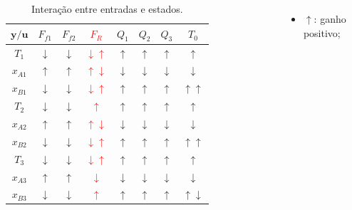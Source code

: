 \begin{frame}
  \newcommand{\ua}{$\uparrow$}
  \newcommand{\da}{$\downarrow$}
  \newcommand{\nz}{$\approx 0$}
  \newcommand{\nm}{$^{\text{nm}}$}
  \begin{columns}
    \small
    \begin{table}[h!]
      \centering
      \begin{tabular}{c|ccccccc}
        \hline
        $\mathbf{y} / \mathbf{u}$ & $F_{f1}$ & $F_{f2}$ & \textcolor{red}{$F_R$} & $Q_1$ & $Q_2$ & $Q_3$ & $T_0$ \\
        \hline
        $T_1$    & \da & \da & \textcolor{red}{\da\ua} & \ua    & \ua    & \ua    & \ua    \\
        $x_{A1}$ & \ua & \ua & \textcolor{red}{\ua\da} & \da    & \da    & \da    & \da    \\
        $x_{B1}$ & \da & \da & \textcolor{red}{\da\ua} & \ua    & \ua    & \ua    & \ua\ua \\
        \hline
        $T_2$    & \da & \da & \textcolor{red}{\ua}    & \ua    & \ua    & \ua    & \ua    \\
        $x_{A2}$ & \ua & \ua & \textcolor{red}{\ua\da} & \da    & \da    & \da    & \da    \\
        $x_{B2}$ & \da & \da & \textcolor{red}{\da\ua} & \ua    & \ua    & \ua    & \ua\ua \\
        \hline
        $T_3$    & \da & \da & \textcolor{red}{\da\ua}    & \ua    & \ua    & \ua    & \ua    \\
        $x_{A3}$ & \ua & \ua & \textcolor{red}{\da}       & \da    & \da    & \da    & \da    \\
        $x_{B3}$ & \da & \da & \textcolor{red}{\ua}       & \ua    & \ua    & \ua    & \ua\da \\
        \hline
      \end{tabular}
      \caption{Interação entre entradas e estados.}
    \end{table}
    \begin{itemize}
      \item \ua: ganho positivo;

\end{itemize}
\end{columns}
\end{frame}
